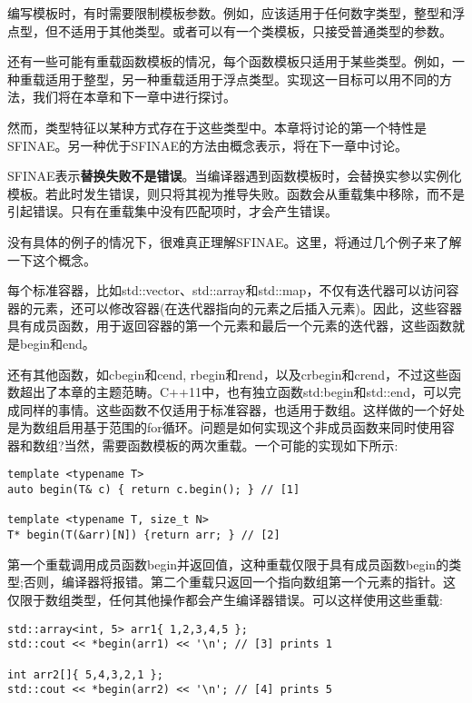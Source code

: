 编写模板时，有时需要限制模板参数。例如，应该适用于任何数字类型，整型和浮点型，但不适用于其他类型。或者可以有一个类模板，只接受普通类型的参数。

还有一些可能有重载函数模板的情况，每个函数模板只适用于某些类型。例如，一种重载适用于整型，另一种重载适用于浮点类型。实现这一目标可以用不同的方法，我们将在本章和下一章中进行探讨。

然而，类型特征以某种方式存在于这些类型中。本章将讨论的第一个特性是SFINAE。另一种优于SFINAE的方法由概念表示，将在下一章中讨论。

SFINAE表示\textbf{替换失败不是错误}。当编译器遇到函数模板时，会替换实参以实例化模板。若此时发生错误，则只将其视为推导失败。函数会从重载集中移除，而不是引起错误。只有在重载集中没有匹配项时，才会产生错误。

没有具体的例子的情况下，很难真正理解SFINAE。这里，将通过几个例子来了解一下这个概念。

每个标准容器，比如std::vector、std::array和std::map，不仅有迭代器可以访问容器的元素，还可以修改容器(在迭代器指向的元素之后插入元素)。因此，这些容器具有成员函数，用于返回容器的第一个元素和最后一个元素的迭代器，这些函数就是begin和end。

还有其他函数，如cbegin和cend, rbegin和rend，以及crbegin和crend，不过这些函数超出了本章的主题范畴。C++11中，也有独立函数std:begin和std::end，可以完成同样的事情。这些函数不仅适用于标准容器，也适用于数组。这样做的一个好处是为数组启用基于范围的for循环。问题是如何实现这个非成员函数来同时使用容器和数组?当然，需要函数模板的两次重载。一个可能的实现如下所示:

\begin{lstlisting}[style=styleCXX]
template <typename T>
auto begin(T& c) { return c.begin(); } // [1]

template <typename T, size_t N>
T* begin(T(&arr)[N]) {return arr; } // [2]
\end{lstlisting}

第一个重载调用成员函数begin并返回值，这种重载仅限于具有成员函数begin的类型;否则，编译器将报错。第二个重载只返回一个指向数组第一个元素的指针。这仅限于数组类型，任何其他操作都会产生编译器错误。可以这样使用这些重载:

\begin{lstlisting}[style=styleCXX]
std::array<int, 5> arr1{ 1,2,3,4,5 };
std::cout << *begin(arr1) << '\n'; // [3] prints 1

int arr2[]{ 5,4,3,2,1 };
std::cout << *begin(arr2) << '\n'; // [4] prints 5
\end{lstlisting}

